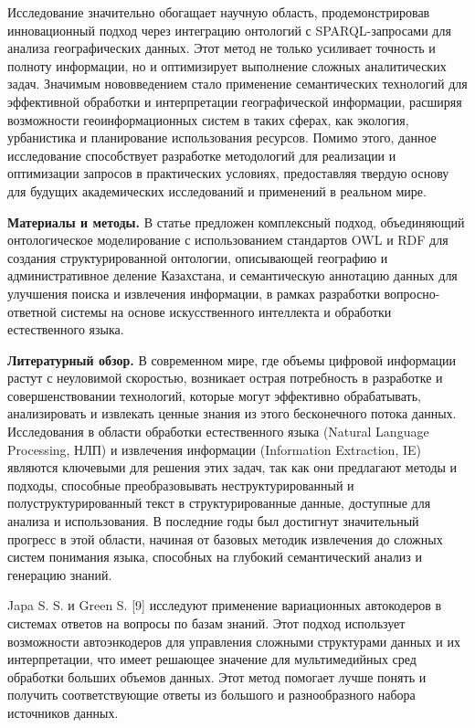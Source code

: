 \begin{multicols}{2}
Исследование значительно обогащает научную область, продемонстрировав
инновационный подход через интеграцию онтологий с SPARQL-запросами для
анализа географических данных. Этот метод не только усиливает точность и
полноту информации, но и оптимизирует выполнение сложных аналитических
задач. Значимым нововведением стало применение семантических технологий
для эффективной обработки и интерпретации географической информации,
расширяя возможности геоинформационных систем в таких сферах, как
экология, урбанистика и планирование использования ресурсов. Помимо
этого, данное исследование способствует разработке методологий для
реализации и оптимизации запросов в практических условиях, предоставляя
твердую основу для будущих академических исследований и применений в
реальном мире.

{\bfseries Материалы и методы.} В статье предложен комплексный подход,
объединяющий онтологическое моделирование с использованием стандартов
OWL и RDF для создания структурированной онтологии, описывающей
географию и административное деление Казахстана, и семантическую
аннотацию данных для улучшения поиска и извлечения информации, в рамках
разработки вопросно-ответной системы на основе искусственного интеллекта
и обработки естественного языка.

{\bfseries Литературный обзор.} В современном мире, где объемы цифровой
информации растут с неуловимой скоростью, возникает острая потребность в
разработке и совершенствовании технологий, которые могут эффективно
обрабатывать, анализировать и извлекать ценные знания из этого
бесконечного потока данных. Исследования в области обработки
естественного языка (Natural Language Processing, НЛП) и извлечения
информации (Information Extraction, IE) являются ключевыми для решения
этих задач, так как они предлагают методы и подходы, способные
преобразовывать неструктурированный и полуструктурированный текст в
структурированные данные, доступные для анализа и использования. В
последние годы был достигнут значительный прогресс в этой области,
начиная от базовых методик извлечения до сложных систем понимания языка,
способных на глубокий семантический анализ и генерацию знаний.

Japa S. S. и Green S. {[}9{]} исследуют применение вариационных
автокодеров в системах ответов на вопросы по базам знаний. Этот подход
использует возможности автоэнкодеров для управления сложными структурами
данных и их интерпретации, что имеет решающее значение для
мультимедийных сред обработки больших объемов данных. Этот метод
помогает лучше понять и получить соответствующие ответы из большого и
разнообразного набора источников данных.


\end{multicols}
